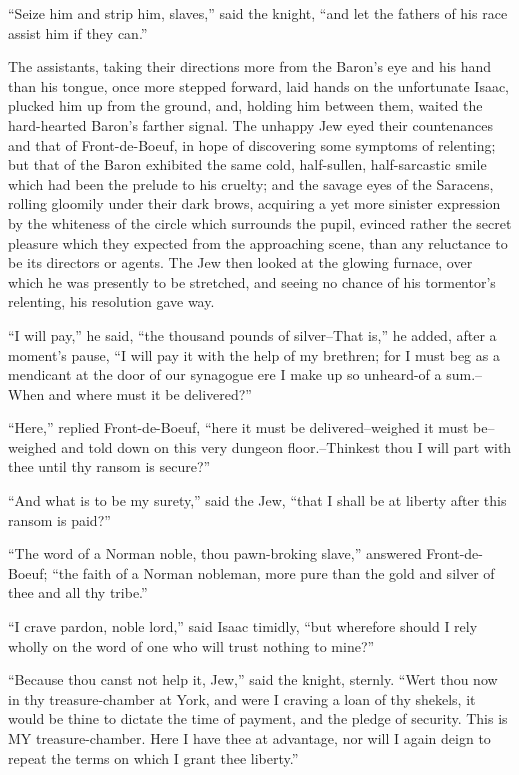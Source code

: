 ``Seize him and strip him, slaves,'' said the knight, ``and let the
fathers of his race assist him if they can.''

The assistants, taking their directions more from the Baron's eye and
his hand than his tongue, once more stepped forward, laid hands on the
unfortunate Isaac, plucked him up from the ground, and, holding him
between them, waited the hard-hearted Baron's farther signal. The
unhappy Jew eyed their countenances and that of Front-de-Boeuf, in hope
of discovering some symptoms of relenting; but that of the Baron
exhibited the same cold, half-sullen, half-sarcastic smile which had
been the prelude to his cruelty; and the savage eyes of the Saracens,
rolling gloomily under their dark brows, acquiring a yet more sinister
expression by the whiteness of the circle which surrounds the pupil,
evinced rather the secret pleasure which they expected from the
approaching scene, than any reluctance to be its directors or agents.
The Jew then looked at the glowing furnace, over which he was presently
to be stretched, and seeing no chance of his tormentor's relenting, his
resolution gave way.

``I will pay,'' he said, ``the thousand pounds of silver--That is,'' he
added, after a moment's pause, ``I will pay it with the help of my
brethren; for I must beg as a mendicant at the door of our synagogue ere
I make up so unheard-of a sum.--When and where must it be delivered?''

``Here,'' replied Front-de-Boeuf, ``here it must be delivered--weighed
it must be--weighed and told down on this very dungeon floor.--Thinkest
thou I will part with thee until thy ransom is secure?''

``And what is to be my surety,'' said the Jew, ``that I shall be at
liberty after this ransom is paid?''

``The word of a Norman noble, thou pawn-broking slave,'' answered
Front-de-Boeuf; ``the faith of a Norman nobleman, more pure than the
gold and silver of thee and all thy tribe.''

``I crave pardon, noble lord,'' said Isaac timidly, ``but wherefore
should I rely wholly on the word of one who will trust nothing to
mine?''

``Because thou canst not help it, Jew,'' said the knight, sternly.
``Wert thou now in thy treasure-chamber at York, and were I craving a
loan of thy shekels, it would be thine to dictate the time of payment,
and the pledge of security. This is MY treasure-chamber. Here I have
thee at advantage, nor will I again deign to repeat the terms on which I
grant thee liberty.''

